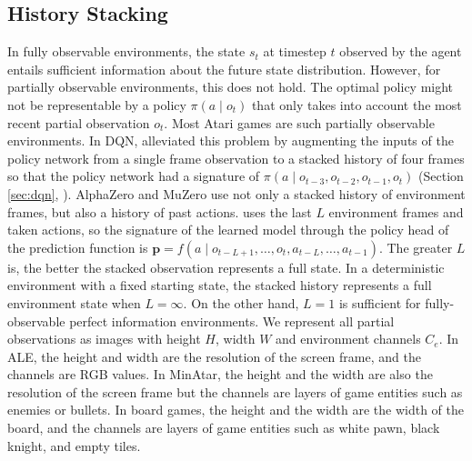 \subsection{History Stacking} \label{sec:history_stacking}
In fully observable environments, the state $s_t$ at timestep $t$ observed by the agent entails sufficient information about the future state distribution.
However, for partially observable environments, this does not hold.
The optimal policy might not be representable by a policy $\pi(a \mid o_t)$ that only takes into account the most recent partial observation $o_t$.
Most Atari games are such partially observable environments.
In DQN, \citeauthor{PlayingAtariDeep_Mnih.Kavukcuoglu.ea_2013} alleviated this problem by augmenting the inputs of the policy network from a single frame observation to a stacked history of four frames so that the policy network had a signature of $\pi(a \mid o_{t-3}, o_{t-2}, o_{t-1}, o_t)$ (Section \ref{sec:dqn}, \cite{PlayingAtariDeep_Mnih.Kavukcuoglu.ea_2013}).
AlphaZero and MuZero use not only a stacked history of environment frames, but also a history of past actions.
\moozi uses the last $L$ environment frames and taken actions, so the signature of the learned model through the policy head of the prediction function is $\mathbf{p} = f(a \mid o_{t - L + 1}, \dots, o_t, a_{t - L}, \dots, a_{t-1})$.
The greater $L$ is, the better the stacked observation represents a full state.
In a deterministic environment with a fixed starting state, the stacked history represents a full environment state when $L = \infty$.
On the other hand, $L = 1$ is sufficient for fully-observable perfect information environments.
We represent all partial observations as images with height $H$, width $W$ and environment channels $C_e$.
In ALE, the height and width are the resolution of the screen frame, and the channels are RGB values.
In MinAtar, the height and the width are also the resolution of the screen frame but the channels are layers of game entities such as enemies or bullets.
In board games, the height and the width are the width of the board, and the channels are layers of game entities such as white pawn, black knight, and empty tiles.

